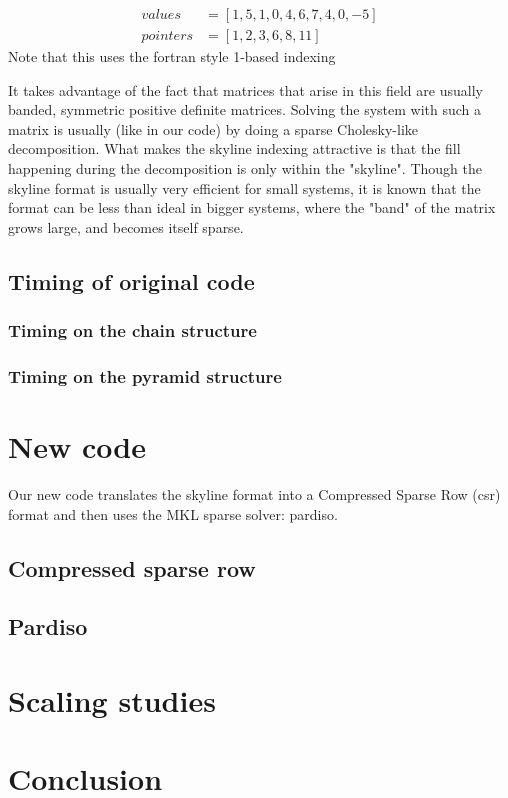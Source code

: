 \documentclass[11pt]{article}
\begin{document}
\begin{align}
values&=[1,5,1,0,4,6,7,4,0,-5]\\
pointers&= [1,2,3,6,8,11] 
\end{align}
Note that this uses the fortran style 1-based indexing

 It takes advantage of the fact that matrices that arise in this field are usually banded, symmetric positive definite matrices. Solving the system with such a matrix is usually (like in our code) by doing a sparse Cholesky-like decomposition. What makes the skyline indexing attractive is that the fill happening during the decomposition is only within the "skyline".
Though the skyline format is usually very efficient for small systems, it is known that the format can be less than ideal in bigger systems, where the "band" of the matrix grows large, and becomes itself  sparse.

\subsection{Timing of original code}
\subsubsection{Timing on the chain structure}

\subsubsection{Timing on the pyramid structure}

\section{New code}
Our new code translates the skyline format into a Compressed Sparse Row (csr) format and then uses the MKL sparse solver: pardiso.

\subsection{Compressed sparse row}

\subsection{Pardiso}


\section{Scaling studies}

\section{Conclusion}
\end{document}
